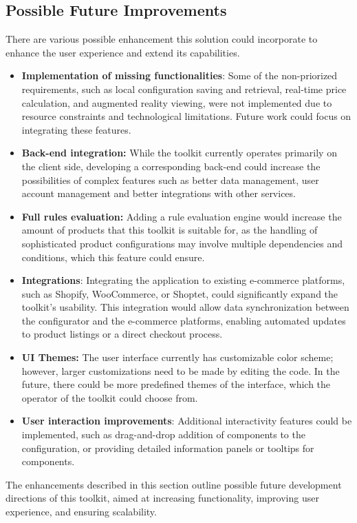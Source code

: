 \subsection{Possible Future Improvements} \label{section:improvements}

There are various possible enhancement this solution could incorporate to enhance the user experience and extend its capabilities.

\begin{itemize}[label=\rectanglebullet]
    \item \textbf{Implementation of missing functionalities}: Some of the non-priorized requirements, such as local configuration saving and retrieval, real-time price calculation, and augmented reality viewing, were not implemented due to resource constraints and technological limitations. Future work could focus on integrating these features.
    \item \textbf{Back-end integration:} While the toolkit currently operates primarily on the client side, developing a corresponding back-end could increase the possibilities of complex features such as better data management, user account management and better integrations with other services.
    \item \textbf{Full rules evaluation:} Adding a rule evaluation engine would increase the amount of products that this toolkit is suitable for, as the handling of sophisticated product configurations may involve multiple dependencies and conditions, which this feature could ensure.
    \item \textbf{Integrations}: Integrating the application to existing e-commerce platforms, such as Shopify, WooCommerce, or Shoptet, could significantly expand the toolkit's usability. This integration would allow data synchronization between the configurator and the e-commerce platforms, enabling automated updates to product listings or a direct checkout process.
    \item \textbf{UI Themes:} The user interface currently has customizable color scheme; however, larger customizations need to be made by editing the  code. In the future, there could be more predefined themes of the interface, which the operator of the toolkit could choose from.
    \item \textbf{User interaction improvements}: Additional interactivity features could be implemented, such as drag-and-drop addition of components to the configuration, or providing detailed information panels or tooltips for components.
\end{itemize}

The enhancements described in this section outline possible future development directions of this toolkit, aimed at increasing functionality, improving user experience, and ensuring scalability.